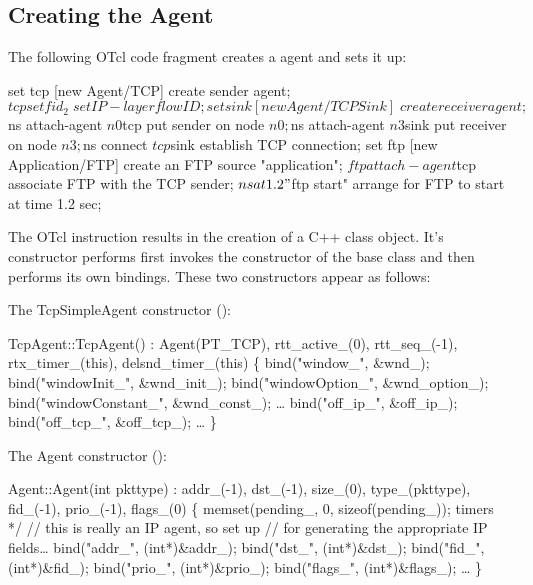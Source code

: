 \subsection{Creating the Agent}
\label{sec:createtcpsimple}

The following OTcl code fragment creates a  agent
and sets it up:
\begin{program}
        set tcp [new Agent/TCP]         \; create sender agent;
        $tcp set fid_ 2                 \; set IP-layer flow ID;
        set sink [new Agent/TCPSink]    \; create receiver agent;
        $ns attach-agent $n0 $tcp       \; put sender on node $n0;
        $ns attach-agent $n3 $sink      \; put receiver on node $n3;
        $ns connect $tcp $sink          \; establish TCP connection;
        set ftp [new Application/FTP]        \; create an FTP source "application";
        $ftp attach-agent $tcp            \; associate FTP with the TCP sender;
        $ns at 1.2 "$ftp start"  \;arrange for FTP to start at time 1.2 sec;
\end{program}
The OTcl instruction  results in the
creation of a C++  class object.
It's constructor performs first invokes the constructor of the
 base class and then performs its own bindings.
These two constructors appear as follows:
\begin{program}
{\rm The TcpSimpleAgent constructor ():}

        TcpAgent::TcpAgent() : Agent(PT_TCP), rtt_active_(0), rtt_seq_(-1),
                        rtx_timer_(this), delsnd_timer_(this)
        \{
                bind("window_", &wnd_);
                bind("windowInit_", &wnd_init_);
                bind("windowOption_", &wnd_option_);
                bind("windowConstant_", &wnd_const_);
                \ldots
                bind("off_ip_", &off_ip_);
                bind("off_tcp_", &off_tcp_);
                \ldots
        \}

{\rm The Agent constructor ():}

        Agent::Agent(int pkttype) : 
                addr_(-1), dst_(-1), size_(0), type_(pkttype), fid_(-1),
                prio_(-1), flags_(0)
        \{
                memset(pending_, 0, sizeof(pending_)); \* timers */
                // {\cf this is really an IP agent, so set up}
                // {\cf for generating the appropriate IP fields\ldots}
                bind("addr_", (int*)&addr_);
                bind("dst_", (int*)&dst_);
                bind("fid_", (int*)&fid_);
                bind("prio_", (int*)&prio_);
                bind("flags_", (int*)&flags_);
                \ldots
        \}
\end{program}
